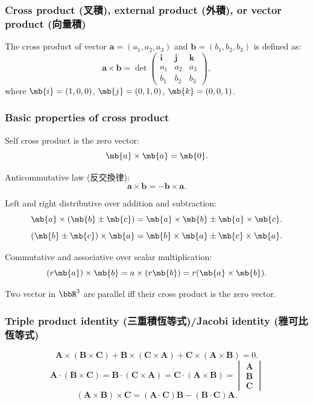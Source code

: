 \documentclass[a4paper,12pt]{report}
\begin{document}
\subsubsection{Cross product (叉積), external product (外積), or vector product (向量積)}
The cross product of vector $\mathbf{a}=(a_1,a_2,a_3)$ and $\mathbf{b}=(b_1,b_2,b_3)$ is defined as:
\[\mathbf{a}\times\mathbf{b}=\det\begin{pmatrix}\mathbf{i} & \mathbf{j} & \mathbf{k}\\a_1 & a_2 & a_3\\b_1 & b_2 & b_3\end{pmatrix},\]
where $\mb{i}=(1,0,0)$, $\mb{j}=(0,1,0)$, $\mb{k}=(0,0,1)$.
\subsubsection{Basic properties of cross product}
\bit
\item Self cross product is the zero vector:
\[\mb{a}\times\mb{a}=\mb{0}.\]
\item Anticommutative law (反交換律):
\[\mathbf{a}\times\mathbf{b}=-\mathbf{b}\times\mathbf{a}.\]
\item Left and right distributive over addition and subtraction:
\[\mb{a}\times(\mb{b}\pm\mb{c})=\mb{a}\times\mb{b}\pm\mb{a}\times\mb{c}.\]
\[(\mb{b}\pm\mb{c})\times\mb{a}=\mb{b}\times\mb{a}\pm\mb{c}\times\mb{a}.\]
\item Commutative and associative over scalar multiplication:
\[(r\mb{a})\times\mb{b}=a\times(r\mb{b})=r(\mb{a}\times\mb{b}).\]
\item Two vector in $\bbR^3$ are parallel iff their cross product is the zero vector.
\eit
\subsubsection{Triple product identity (三重積恆等式)/Jacobi identity (雅可比恆等式)}
\[\mathbf{A}\times(\mathbf{B}\times\mathbf{C})+\mathbf{B}\times(\mathbf{C}\times\mathbf{A})+\mathbf{C}\times(\mathbf{A}\times\mathbf{B})=0.\]
\[\mathbf{A}\cdot(\mathbf{B}\times\mathbf{C})=\mathbf{B}\cdot(\mathbf{C}\times\mathbf{A})=\mathbf{C}\cdot(\mathbf{A}\times\mathbf{B})=\begin{vmatrix}\mathbf{A}\\\mathbf{B}\\\mathbf{C}\end{vmatrix}\]
\[(\mathbf{A}\times\mathbf{B})\times\mathbf{C}=(\mathbf{A}\cdot\mathbf{C})\mathbf{B}-(\mathbf{B}\cdot\mathbf{C})\mathbf{A}.\]
\end{document}

